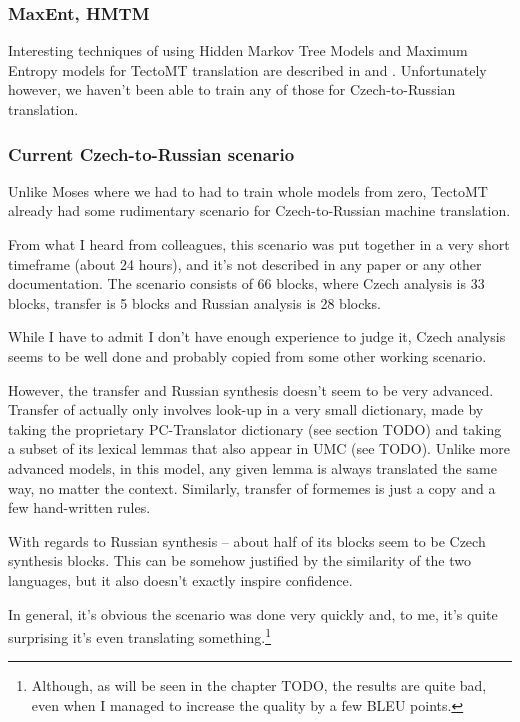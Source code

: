\subsubsection{MaxEnt, HMTM}
Interesting techniques of using Hidden Markov Tree Models and Maximum Entropy models for TectoMT translation are described in \cite{tecto_hmtm} and \cite{tecto_maxent}. Unfortunately however, we haven't been able to train any of those for Czech-to-Russian translation.

\subsubsection{Current Czech-to-Russian scenario}
Unlike Moses where we had to had to train whole models from zero, TectoMT already had some rudimentary scenario for Czech-to-Russian machine translation.

From what I heard from colleagues, this scenario was put together in a very short timeframe (about 24 hours), and it's not described in any paper or any other documentation. The scenario consists of 66 blocks, where Czech analysis is 33 blocks, transfer is 5 blocks and Russian analysis is 28 blocks. 

While I have to admit I don't have enough experience to judge it, Czech analysis seems to be well done and probably copied from some other working scenario.

However, the transfer and Russian synthesis doesn't seem to be very advanced. Transfer of  actually only involves look-up in a very small dictionary, made by taking the proprietary PC-Translator dictionary (see section TODO) and taking a subset of its lexical lemmas that also appear in UMC (see TODO). Unlike more advanced models, in this model, any given lemma is always translated the same way, no matter the context. Similarly, transfer of formemes is just a copy and a few hand-written rules.

With regards to Russian synthesis -- about half of its blocks seem to be Czech synthesis blocks.
This can be somehow justified by the similarity of the two languages, but it also doesn't exactly inspire confidence.


In general, it's obvious the scenario was done very quickly and, to me, it's quite surprising it's even translating something.\footnote{Although, as will be seen in the chapter TODO, the results are quite bad, even when I managed to increase the quality by a few BLEU points.}
